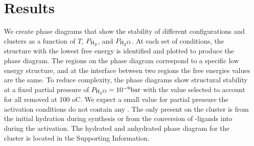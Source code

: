 \documentclass[journal=jctcce,manuscript=article]{achemso}
\begin{document}
\newpage

\section{Results}
We create phase diagrams that show the stability of different configurations and clusters as a function of $T$, $P_{\text{\ce{H2}}}$, and $P_{\text{\ce{H2O}}}$. At each set of conditions, the structure with the lowest free energy is identified and plotted to produce the phase diagram. The regions on the phase diagram correspond to a specific low energy structure, and at the interface between two regions the free energies values are the same. To reduce complexity, the phase diagrams show structural stability at a fixed partial pressure of $P_{\text{\ce{H2O}}} = 10^{-9} \text{bar}$ with the value selected to account for all  removed at 100 oC. We expect a small value for  partial pressure the activation conditions do not contain any . The only  present on the cluster is from the initial hydration during synthesis or from the conversion of -ligands into  during the activation. The hydrated and anhydrated phase diagram for the  cluster is located in the Supporting Information. 
\end{document}
